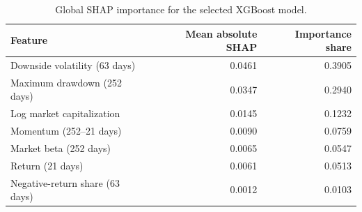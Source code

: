 \begin{table}
\caption{Global SHAP importance for the selected XGBoost model.}
\label{tab:xgboost-shap-importance}
\begin{tabular}{lrr}
\toprule
Feature & Mean absolute SHAP & Importance share \\
\midrule
Downside volatility (63 days) & 0.0461 & 0.3905 \\
Maximum drawdown (252 days) & 0.0347 & 0.2940 \\
Log market capitalization & 0.0145 & 0.1232 \\
Momentum (252--21 days) & 0.0090 & 0.0759 \\
Market beta (252 days) & 0.0065 & 0.0547 \\
Return (21 days) & 0.0061 & 0.0513 \\
Negative-return share (63 days) & 0.0012 & 0.0103 \\
\bottomrule
\end{tabular}
\end{table}
